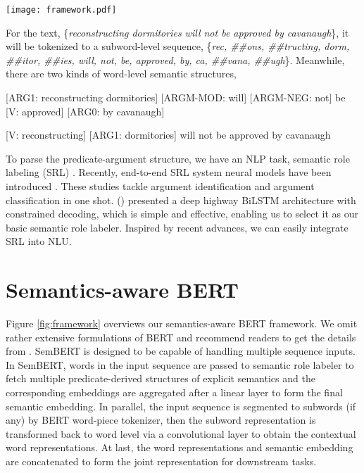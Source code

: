 \documentclass[letterpaper]{article} \usepackage{aaai20}  \usepackage{times}  \usepackage{helvet} \usepackage{courier}  \usepackage[hyphens]{url}  \usepackage{graphicx} \urlstyle{rm} \def\UrlFont{\rm}  \usepackage{graphicx}  \frenchspacing  \usepackage{amssymb}
\begin{document}
\begin{figure*}[!htb]
	\centering
	\texttt{[image: framework.pdf]}
	\\\begin{flushleft}
		\scriptsize{For the text, \{\emph{reconstructing dormitories will not be approved by cavanaugh}\}, it will be tokenized to a subword-level sequence, \{\emph{rec, \#\#ons, \#\#tructing, dorm, \#\#itor, \#\#ies, will, not, be, approved, by, ca, \#\#vana, \#\#ugh}\}. Meanwhile, there are two kinds of word-level semantic structures,
			
[ARG1: reconstructing dormitories] [ARGM-MOD: will] [ARGM-NEG: not] be [V: approved] [ARG0: by cavanaugh]
	
[V: reconstructing] [ARG1: dormitories] will not be approved by cavanaugh}
	\end{flushleft}
	\caption{\label{fig:framework}Semantics-aware BERT. * denotes the pre-trained labeler which will not be fine-tuned in our framework.}
	
\end{figure*}
To parse the predicate-argument structure, we have an NLP task, semantic role labeling (SRL) \cite{zhao2009semantic,zhao2013integrative}. Recently, end-to-end SRL system neural models have been introduced \cite{He2017Deep,li2019dependency}. These studies tackle argument identification and argument classification in one shot.  \citeauthor{He2017Deep} (\citeyear{He2017Deep}) presented a deep highway BiLSTM architecture with constrained decoding, which is simple and effective, enabling us to select it as our basic semantic role labeler. Inspired by recent advances, we can easily integrate SRL into NLU. 


\section{Semantics-aware BERT}\label{sec:bert}
Figure \ref{fig:framework} overviews our semantics-aware BERT framework. We omit rather extensive formulations of BERT and recommend readers to get the details from \cite{devlin2018bert}. SemBERT is designed to be capable of handling multiple sequence inputs. In SemBERT, words in the input sequence are passed to semantic role labeler to fetch multiple predicate-derived structures of explicit semantics and the corresponding embeddings are aggregated after a linear layer to form the final semantic embedding. In parallel, the input sequence is segmented to subwords (if any) by BERT word-piece tokenizer, then the subword representation is transformed back to word level via a convolutional layer to obtain the contextual word representations. At last, the word representations and semantic embedding are concatenated to form the joint representation for downstream tasks.
\end{document}
